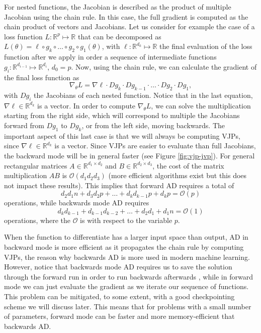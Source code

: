 For nested functions, the Jacobian is described as the product of multiple Jacobian using the chain rule.
In this case, the full gradient is computed as the chain product of vectors and Jacobians. 
Let us consider for example the case of a loss function $L : \mathbb R^p \mapsto \mathbb R$ that can be decomposed as $L(\theta) = \ell \circ g_{k} \circ \ldots \circ g_2 \circ g_1(\theta)$, with $\ell : \mathbb R^{d_k} \mapsto \mathbb R$ the final evaluation of the loss function after we apply in order a sequence of intermediate functions $g_i : \mathbb R^{d_{i-1}} \mapsto \mathbb R^{d_i}$, $d_0 = p$. 
Now, using the chain rule, we can calculate the gradient of the final loss function as
\begin{equation}
 \nabla_\theta L = \nabla \ell \cdot Dg_{k} \cdot Dg_{k-1} \cdot \ldots \cdot Dg_2 \cdot Dg_1, 
\end{equation}
with $Dg_i$ the Jacobians of each nested function. 
Notice that in the last equation, $\nabla \ell \in \mathbb R^{d_k}$ is a vector.
In order to compute $\nabla_\theta L$, we can solve the multiplication starting from the right side, which will correspond to multiple the Jacobians forward from $Dg_1$ to $Dg_k$, or from the left side, moving backwards. 
The important aspect of this last case is that we will always be computing VJPs, since $\nabla \ell \in \mathbb R^{d_k}$ is a vector.
Since VJPs are easier to evaluate than full Jacobians, the backward mode will be in general faster (see Figure \ref{fig:vjp-jvp}). 
For general rectangular matrices $A\in \mathbb R^{d_1 \times d_2}$ and $B \in \mathbb R^{d_2 \times d_3}$, the cost of the matrix multiplication $AB$ is $\mathcal O (d_1 d_2 d_3)$ (more efficient algorithms exist but this does not impact these results). This implies that forward AD requires a total of
\begin{equation}
 d_2 d_1 n + d_3 d_2 p + \ldots + d_k d_{k-1} p + d_k p = \mathcal O (p)
\end{equation}
operations, while backwards mode AD requires
\begin{equation}
 d_k d_{k-1} + d_{k-1} d_{k-2} + \ldots + d_2 d_1 + d_1 n = \mathcal O (1)
\end{equation}
operations, where the $\mathcal O$ is with respect to the variable $p$. 

When the function to differentiate has a larger input space than output, AD in backward mode is more efficient as it propagates the chain rule by computing VJPs, the reason why backwards AD is more used in modern machine learning.
However, notice that backwards mode AD requires us to save the solution through the forward run in order to run backwards afterwards \cite{Bennett_1973}, while in forward mode we can just evaluate the gradient as we iterate our sequence of functions. 
This problem can be mitigated, to some extent, with a good checkpointing scheme we will discuss later. 
This means that for problems with a small number of parameters, forward mode can be faster and more memory-efficient that backwards AD.

